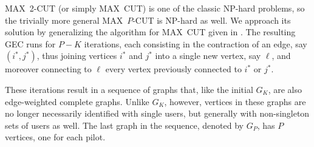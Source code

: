 \documentclass[]{IEEEtran}
\begin{document}
MAX~2-CUT (or simply MAX~CUT) is one of the classic NP-hard problems, so the
trivially more general MAX~$P$-CUT is NP-hard as well. We approach its solution
by generalizing the algorithm for MAX~CUT given in \cite{kkbh08}. The resulting
GEC runs for $P-K$ iterations, each consisting in the contraction of an edge,
say $(i^*,j^*)$, thus joining vertices $i^*$ and $j^*$ into a single new vertex,
say $\ell$, and moreover connecting to $\ell$ every vertex previously connected
to $i^*$ or $j^*$.

These iterations result in a sequence of graphs that, like the initial $G_K$,
are also edge-weighted complete graphs. Unlike $G_K$, however, vertices in these
graphs are no longer necessarily identified with single users, but generally
with non-singleton sets of users as well. The last graph in the sequence,
denoted by $G_P$, has $P$ vertices, one for each pilot.
\end{document}
